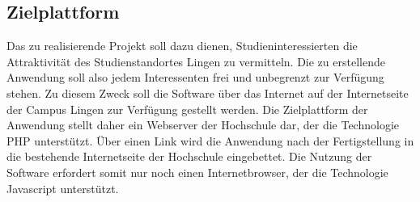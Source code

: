 \subsection{Zielplattform}
\label{sec:Zielplattform}

Das zu realisierende Projekt soll dazu dienen, Studieninteressierten die
Attraktivität des Studienstandortes Lingen zu vermitteln. Die zu erstellende
Anwendung soll also jedem Interessenten frei und unbegrenzt zur Verfügung
stehen. Zu diesem Zweck soll die Software über das Internet auf der
Internetseite der Campus Lingen zur Verfügung gestellt werden. Die
Zielplattform der Anwendung stellt daher ein Webserver der Hochschule dar, der
die Technologie PHP unterstützt. Über einen Link wird die Anwendung nach der
Fertigstellung in die bestehende Internetseite der Hochschule eingebettet. Die
Nutzung der Software erfordert somit nur noch einen Internetbrowser, der die
Technologie Javascript unterstützt.

